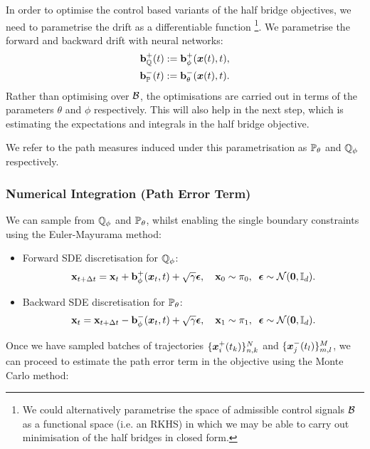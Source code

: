 \documentclass[a4paper,12pt,twoside,openright]{report}
\theoremstyle{definition}
\begin{document}
In order to optimise the control based variants of the half bridge objectives, we need to parametrise the drift as a differentiable function \footnote{We could alternatively parametrise the space of admissible control signals $\calB$ as a functional space (i.e. an  RKHS) in which we may be able to carry out minimisation of the half bridges in closed form.}. We parametrise the forward and backward drift with neural networks:
\begin{align} \label{eq:drift_param}
    \rvb^{+}_{\Q}(t) := \rvb^{+}_{\phi}(\vx(t), t), \nonumber \\
    \rvb^{-}_{\P}(t) := \rvb^{-}_{\theta}(\vx(t), t).
\end{align}
Rather than optimising over $\calB$, the optimisations are carried out in terms of the parameters $\theta$ and $\phi$ respectively. This will also help in the next step, which is estimating the expectations and integrals in the half bridge objective.

We refer to the path measures induced under this parametrisation as $\P_{\theta}$ and $\Q_{\phi}$ respectively.

\subsubsection{Numerical Integration (Path Error Term)}
We can sample from $\Q_{\phi}$ and $\P_{\theta}$, whilst enabling the single boundary constraints using the Euler-Mayurama method:
\begin{itemize}
    \item  Forward SDE discretisation for $\Q_{\phi}$:
\begin{align*}
    \rvx_{t + \Delta t} = \rvx_t + \rvb^{+}_{\phi}(\vx_t, t) + \sqrt{\gamma} \rvepsilon, \quad \rvx_0 \sim \pi_0, \;\;\rvepsilon \sim \calN(\vzero, \I).
\end{align*}
    \item  Backward SDE discretisation for $\P_{\theta}$:
\begin{align*}
    \rvx_{t} = \rvx_{t+\Delta t} - \rvb^{-}_{\phi}(\vx_t, t) + \sqrt{\gamma} \rvepsilon, \quad \rvx_1 \sim \pi_1,\;\; \rvepsilon \sim \calN(\vzero, \I).
\end{align*}
\end{itemize}

Once we have sampled batches of trajectories $\{\vx^{+}_i(t_k)\}_{n,k}^N$ and $\{\vx^{-}_j(t_l)\}_{m,l}^M$, we can proceed to estimate the path error term in the objective using the Monte Carlo  method:
\end{document}

